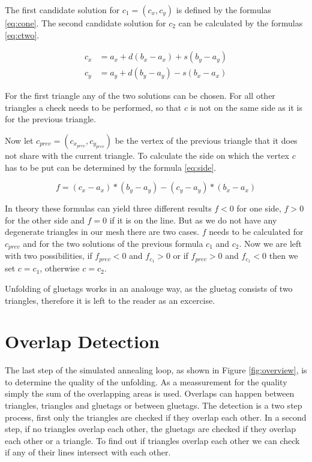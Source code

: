 \documentclass[draft,final]{vutinfth} %
\begin{document}
The first candidate solution for $c_1 = (c_x, c_y)$ is defined by the formulas \ref{eq:cone}. The second candidate solution for $c_2$ can be calculated by the formulas \ref{eq:ctwo}. 

\begin{equation}
\label{eq:ctwo}
\begin{split}
c_x &= a_x + d(b_x - a_x) + s(b_y - a_y)\\
c_y &= a_y + d(b_y - a_y) - s(b_x - a_x)
\end{split}
\end{equation}

For the first triangle any of the two solutions can be chosen. For all other triangles a check needs to be performed, so that $c$ is not on the same side as it is for the previous triangle.


Now let $c_{prev} = (c_{x_{prev}},c_{y_{prev}})$ be the vertex of the previous triangle that it does not share with the current triangle. To calculate the side on which the vertex $c$ has to be put can be determined by the formula \ref{eq:side}.

\begin{equation}
\label{eq:side}
f = (c_x - a_x) * (b_y - a_y) - (c_y - a_y) * (b_x - a_x)
\end{equation}

In theory these formulas can yield three different results $f < 0$ for one side, $f > 0$ for the other side and $f = 0$ if it is on the line. But as we do not have any degenerate triangles in our mesh there are two cases. $f$ needs to be calculated for $c_{prev}$ and for the two solutions of the previous formula $c_1$ and $c_2$. Now we are left with two possibilities, if $f_{prev} < 0$ and $f_{c_1} > 0$ or if $f_{prev} > 0$ and $f_{c_1} < 0$ then we set $c = c_1$, otherwise $c = c_2$.

Unfolding of gluetags works in an analouge way, as the gluetag consists of two triangles, therefore it is left to the reader as an excercise.

\section{Overlap Detection}

The last step of the simulated annealing loop, as shown in Figure \ref{fig:overview}, is to determine the quality of the unfolding. As a meassurement for the quality simply the sum of the overlapping areas is used. Overlaps can happen between triangles, triangles and gluetags or between gluetags. The detection is a two step process, first only the triangles are checked if they overlap each other. In a second step, if no triangles overlap each other, the gluetags are checked if they overlap each other or a triangle. To find out if triangles overlap each other we can check if any of their lines intersect with each other.
\end{document}
